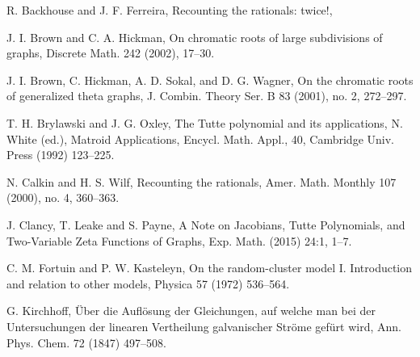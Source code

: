 \documentclass{amsart}
\theoremstyle{definition}
\begin{document}
\begin{thebibliography}{99}



R. Backhouse and J. F. Ferreira,
{Recounting the rationals: twice!},





J. I. Brown and C. A. Hickman,
{On chromatic roots of large subdivisions of graphs},
Discrete Math.
{242} (2002),
17--30.

J. I. Brown, C. Hickman, A. D. Sokal, and D. G. Wagner,
{On the chromatic roots of generalized theta graphs},
J. Combin. Theory Ser. B 
{83} (2001),
no. 2, 
272--297.

T. H. Brylawski and J. G. Oxley,
{The Tutte polynomial and its applications},
N. White (ed.),
{Matroid Applications}, {Encycl. Math. Appl.},
{40},
Cambridge Univ. Press (1992)
123--225.

N. Calkin and H. S. Wilf,
{Recounting the rationals},
Amer. Math. Monthly
107 (2000),
no. 4,
360--363.

J. Clancy, T. Leake and S. Payne,
{A Note on Jacobians, Tutte Polynomials,
and Two-Variable Zeta Functions of Graphs},
Exp. Math. (2015)
24:1, 1--7.

C. M. Fortuin and P. W. Kasteleyn,
{On the random-cluster model 
I. Introduction and relation to other models},
Physica {57} (1972)
536--564.



G. Kirchhoff,
{\"Uber die Aufl\"osung der Gleichungen,
auf welche man bei der Untersuchungen der linearen Vertheilung
galvanischer Str\"ome gef\"urt wird},
Ann. Phys. Chem. {72} (1847)
497--508.


\end{thebibliography}
\end{document}
